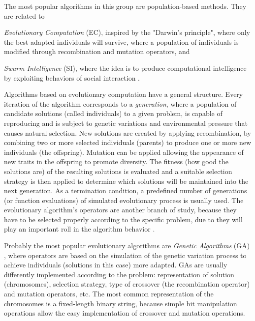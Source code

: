 The most popular algorithms in this group are population-based methods. They are related to \begin{inparaenum}[i)] \item \textit{Evolutionary Computation} (EC), inspired by the "Darwin's principle", where only the best adapted individuals will survive, where a population of individuals is modified through recombination and mutation operators, and \item \textit{Swarm Intelligence} (SI), where the idea is to produce computational intelligence by exploiting behaviors of social interaction \cite{Boussaid2013}.\end{inparaenum} 

Algorithms based on evolutionary computation have a general structure. Every iteration of the algorithm corresponds to a \textit{generation}, where a population of candidate solutions (called individuals) to a given problem, is capable of reproducing and is subject to genetic variations and environmental pressure that causes natural selection. New solutions are created by applying recombination, by combining two or more selected individuals (parents) to produce one or more new individuals (the offspring). Mutation can be applied allowing the appearance of new traits in the offspring to promote diversity. The fitness (how good the solutions are) of the resulting solutions is evaluated and a suitable selection strategy is then applied to determine which solutions will be maintained into the next generation. As a termination condition, a predefined number of generations (or function evaluations) of simulated evolutionary process is usually used. The evolutionary algorithm's operators are another branch of study, because they have to be selected properly according to the specific problem, due to they will play an important roll in the algorithm behavior \cite{Maturana2012}.

Probably the most popular evolutionary algorithms are {\it Genetic Algorithms} (GA) \cite{Reeves2010}, where operators are based on the simulation of the genetic variation  process to achieve individuals (solutions in this case) more adapted. GAs are usually differently implemented according to the problem: representation of solution (chromosomes), selection strategy, type of crossover (the recombination operator) and mutation operators, etc. The most common representation of the chromosomes is a fixed-length binary string, because simple bit manipulation operations allow the easy implementation of crossover and mutation operations.

